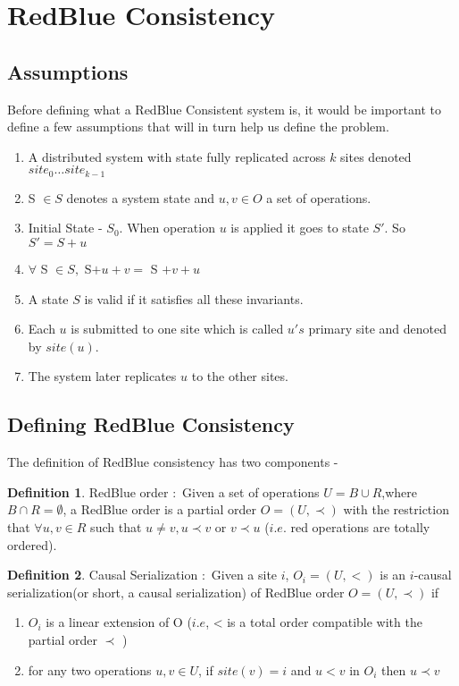 \documentclass[12pt]{article}
\theoremstyle{plain}
\theoremstyle{definition}
\newtheorem{defn}{Definition}[section]
\theoremstyle{remark}
\begin{document}
\section*{RedBlue Consistency}
\subsection*{Assumptions}
Before defining what a RedBlue Consistent system is, it would be important to define a few assumptions that will in turn help us define the problem.
\begin{enumerate}
\item A distributed system with state fully replicated across $k$ sites denoted $site_0 \ldots site_{k-1}$
\item S $\in S$ denotes a system state and $u,v \in O$ a set of operations. 
\item Initial State - $S_0$. When operation $u$ is applied it goes to state $S'$. So $S' = S + u$
\item $ \forall$ S $\in S,$ S$+u+v = $ S $+v+u$
\item A state $S$ is valid if it satisfies all these invariants.
\item Each $u$ is submitted to one site which is called $u's$ primary site and denoted by $site(u)$.
\item The system later replicates $u$ to the other sites.
\end{enumerate}

\subsection*{Defining RedBlue Consistency}
The definition of RedBlue consistency has two components -

\begin{defn}
 RedBlue order $\colon$ Given a set of operations $U = B \cup R$,where $B \cap R = \emptyset$, a RedBlue order is a partial order $O = ( U, \prec)$ with the restriction that $\forall u,v \in R$ such that $u \neq v, u \prec v $ or $v \prec u$ ($i.e.$ red operations are totally ordered).
\end{defn}

\begin{defn}
 Causal Serialization $\colon$ Given a site $i$, $O_i = (U, <)$ is an $i$-causal serialization(or short, a causal serialization) of RedBlue order $O = ( U, \prec)$ if 
 \begin{enumerate}
\item$O_i$ is a linear extension of O ($i.e$, < is a total order compatible with the partial order $\prec$ ) 
\item for any two operations $u,v \in U$, if $site(v) = i$ and $u < v$ in $O_i$ then $u \prec v$
\end{enumerate}
\end{defn}
\end{document}
